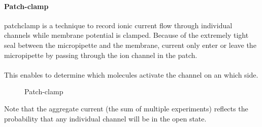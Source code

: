 \documentclass[../main.tex]{subfiles}
\begin{document}
\paragraph{Patch-clamp}

\gls{patchclamp} is a technique to record ionic current flow through individual channels while membrane potential is clamped. Because of the extremely tight seal between the micropipette and the membrane, current only enter or leave the micropipette by passing through the ion channel in the patch.  \\
\\
This enables to determine which molecules activate the channel on an which side.  
\begin{figure}[H]
	\centering
	\caption{Patch-clamp}
	\label{patch-clamp}
\end{figure} 
Note that the aggregate current (the sum of multiple experiments) reflects the probability that any individual channel will be in the open state. 
\end{document}
